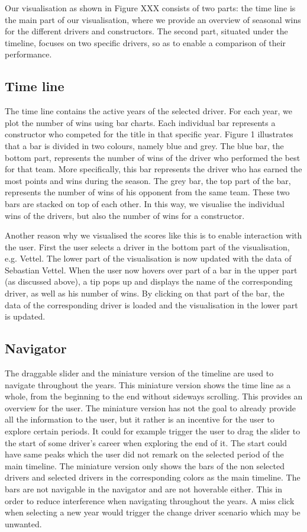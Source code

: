 \documentclass{sigchi}
\begin{document}
Our visualisation as shown in Figure XXX consists of two parts: the time line is the main part of our visualisation, where we provide an overview of seasonal wins for the different drivers and constructors. The second part, situated under the timeline, focuses on two specific drivers, so as to enable a comparison of their performance. 

\subsection{Time line}

The time line contains the active years of the selected driver. For each year, we plot the number of wins using bar charts. Each individual bar represents a constructor who competed for the title in that specific year. Figure 1 illustrates that a bar is divided in two colours, namely blue and grey. The blue bar, the bottom part, represents the number of wins of the driver who performed the best for that team. More specifically, this bar represents the driver who has earned the most points and wins  during the season. The grey bar, the top part of the bar, represents the number of wins of his opponent from the same team. These two bars are stacked on top of each other. In this way, we visualise the individual wins of the drivers, but also the number of wins for a constructor.

Another reason why we visualised the scores like this is to enable interaction with the user. First the user selects a driver in the bottom part of the visualisation, e.g. Vettel. The lower part of the visualisation is now updated with the data of Sebastian Vettel. When the user now hovers over part of a bar in the upper part (as discussed above), a tip pops up and displays the name of the corresponding driver, as well as his number of wins. By clicking on that part of the bar, the data of the corresponding driver is loaded and the visualisation in the lower part is updated. 


\subsection{Navigator}

The draggable slider and the miniature version of the timeline are used to navigate throughout the years. This miniature version shows the time line as a whole, from the beginning to the end without sideways scrolling. This provides an overview for the user. The miniature version has not the goal to already provide all the information to the user, but it rather is an incentive for the user to explore certain periods. It could for example trigger the user to drag the slider to the start of some driver’s career when exploring the end of it. The start could have same peaks which the user did not remark on the selected period of the main timeline.  The miniature version only shows the bars of the non selected drivers and selected drivers in the corresponding colors as the main timeline. The bars are not navigable in the navigator and are not hoverable either. This in order to reduce interference when navigating throughout the years. A miss click when selecting a new year would trigger the change driver scenario which may be unwanted. 
\end{document}
